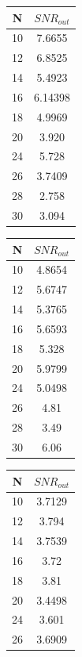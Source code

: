 \documentclass[12pt, a4paper] {ncc}
\begin{document}
        \begin{table}[H]
            \centering
            \begin{tabular} { |c|c| }
                \hline
				\textbf{N} & \textbf{$SNR_{out}$} \\ \hline
			10 &  7.6655 \\ \hline
			12 &  6.8525 \\ \hline
			14 &  5.4923 \\ \hline
			16 &  6.14398 \\ \hline
			18 &  4.9969 \\ \hline
			20 &  3.920 \\ \hline
			24 &  5.728 \\ \hline
			26 &  3.7409 \\ \hline
			28 &  2.758 \\ \hline
			30 &  3.094 \\ \hline
            \end{tabular}
            \begin{tabular} { |c|c| }
                \hline
				\textbf{N} & \textbf{$SNR_{out}$} \\ \hline
			10 &  4.8654 \\ \hline
			12 &  5.6747 \\ \hline
			14 &  5.3765 \\ \hline
			16 &  5.6593 \\ \hline
			18 &  5.328 \\ \hline
			20 &  5.9799 \\ \hline
			24 &  5.0498 \\ \hline
			26 &  4.81 \\ \hline
			28 &  3.49 \\ \hline
			30 &  6.06 \\ \hline
            \end{tabular}
            \begin{tabular} { |c|c| }
                \hline
				\textbf{N} & \textbf{$SNR_{out}$} \\ \hline
			10 &  3.7129 \\ \hline
			12 &  3.794 \\ \hline
			14 &  3.7539 \\ \hline
			16 &  3.72 \\ \hline
			18 &  3.81 \\ \hline
			20 &  3.4498 \\ \hline
			24 &  3.601 \\ \hline
			26 &  3.6909 \\ \hline

\end{tabular}
\end{table}
\end{document}
